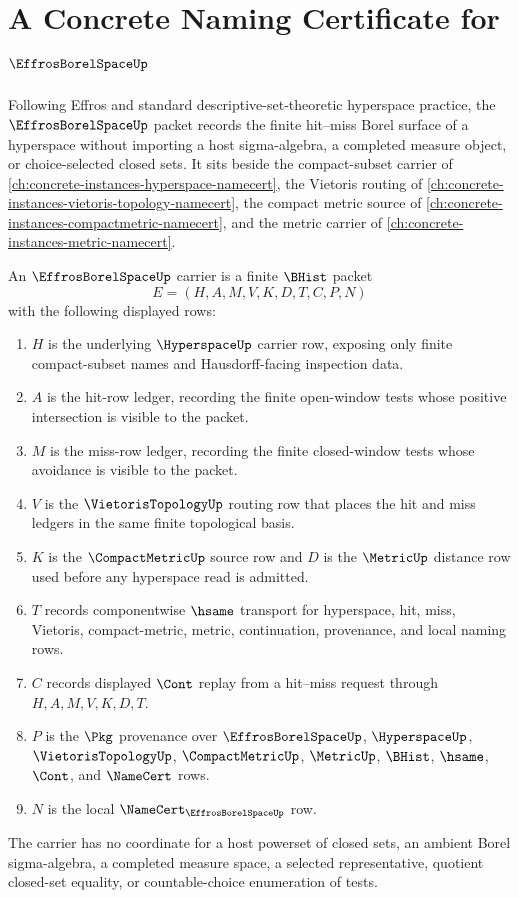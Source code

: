 \chapter{A Concrete Naming Certificate for $\EffrosBorelSpaceUp$}
\label{ch:concrete-instances-effros-borel-space-namecert}

Following Effros and standard descriptive-set-theoretic hyperspace practice, the $\EffrosBorelSpaceUp$ packet records the finite hit--miss Borel surface of a hyperspace without importing a host sigma-algebra, a completed measure object, or choice-selected closed sets. It sits beside the compact-subset carrier of \autoref{ch:concrete-instances-hyperspace-namecert}, the Vietoris routing of \autoref{ch:concrete-instances-vietoris-topology-namecert}, the compact metric source of \autoref{ch:concrete-instances-compactmetric-namecert}, and the metric carrier of \autoref{ch:concrete-instances-metric-namecert}.

\begin{definition}
\label{def:effros-borel-hit-miss-carrier}
An $\EffrosBorelSpaceUp$ carrier is a finite $\BHist$ packet
$$
E=(H,A,M,V,K,D,T,C,P,N)
$$
with the following displayed rows:
\begin{enumerate}
\item $H$ is the underlying $\HyperspaceUp$ carrier row, exposing only finite compact-subset names and Hausdorff-facing inspection data.
\item $A$ is the hit-row ledger, recording the finite open-window tests whose positive intersection is visible to the packet.
\item $M$ is the miss-row ledger, recording the finite closed-window tests whose avoidance is visible to the packet.
\item $V$ is the $\VietorisTopologyUp$ routing row that places the hit and miss ledgers in the same finite topological basis.
\item $K$ is the $\CompactMetricUp$ source row and $D$ is the $\MetricUp$ distance row used before any hyperspace read is admitted.
\item $T$ records componentwise $\hsame$ transport for hyperspace, hit, miss, Vietoris, compact-metric, metric, continuation, provenance, and local naming rows.
\item $C$ records displayed $\Cont$ replay from a hit--miss request through $H,A,M,V,K,D,T$.
\item $P$ is the $\Pkg$ provenance over $\EffrosBorelSpaceUp$, $\HyperspaceUp$, $\VietorisTopologyUp$, $\CompactMetricUp$, $\MetricUp$, $\BHist$, $\hsame$, $\Cont$, and $\NameCert$ rows.
\item $N$ is the local $\NameCert_{\EffrosBorelSpaceUp}$ row.
\end{enumerate}
The carrier has no coordinate for a host powerset of closed sets, an ambient Borel sigma-algebra, a completed measure space, a selected representative, quotient closed-set equality, or countable-choice enumeration of tests.
\end{definition}

